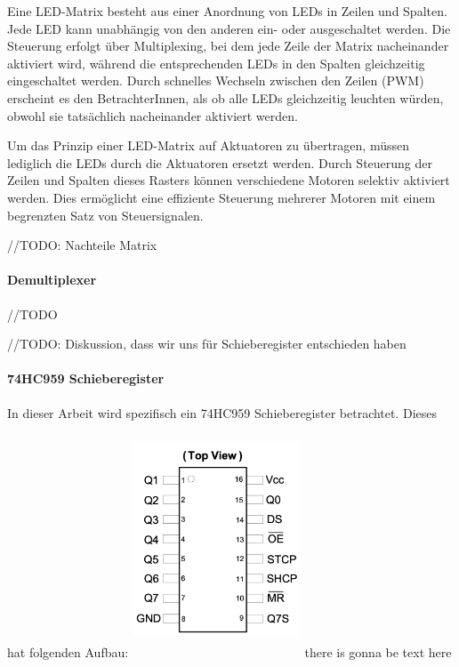 Eine LED-Matrix besteht aus einer Anordnung von LEDs in Zeilen und Spalten. Jede LED kann unabhängig von den anderen
ein- oder ausgeschaltet werden. Die Steuerung erfolgt über Multiplexing, bei dem jede Zeile der Matrix nacheinander
aktiviert wird, während die entsprechenden LEDs in den Spalten gleichzeitig eingeschaltet werden. Durch schnelles
Wechseln zwischen den Zeilen (PWM) erscheint es den BetrachterInnen, als ob alle LEDs gleichzeitig leuchten würden,
obwohl sie tatsächlich nacheinander aktiviert werden. \newline

Um das Prinzip einer LED-Matrix auf Aktuatoren zu übertragen, müssen lediglich die LEDs durch die Aktuatoren ersetzt werden.
Durch Steuerung der Zeilen und Spalten dieses Rasters können verschiedene Motoren selektiv
aktiviert werden. Dies ermöglicht eine effiziente Steuerung mehrerer Motoren mit einem begrenzten Satz von
Steuersignalen. \newline

//TODO: Nachteile Matrix


\paragraph{Demultiplexer}
//TODO \newline

//TODO: Diskussion, dass wir uns für Schieberegister entschieden haben
\paragraph{74HC959 Schieberegister}
In dieser Arbeit wird spezifisch ein 74HC959 Schieberegister betrachtet. Dieses hat folgenden Aufbau:
\newline
\includegraphics [width=5cm, height=7cm] {img/Schieberegister} \newline
there is gonna be text here


